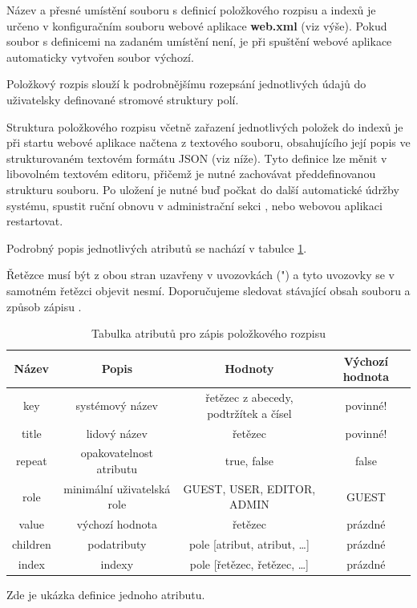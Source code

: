 {\color{OliveGreen} Název a přesné umístění souboru s definicí položkového rozpisu a indexů je určeno v konfiguračním souboru webové aplikace {\bf web.xml} (viz výše). Pokud soubor s definicemi na zadaném umístění není, je při spuštění webové aplikace automaticky vytvořen soubor výchozí.}

Položkový rozpis slouží k podrobnějšímu rozepsání jednotlivých údajů do uživatelsky definované stromové struktury polí.

Struktura položkového rozpisu včetně zařazení jednotlivých položek do indexů je při startu webové aplikace načtena z textového souboru, obsahujícího její popis ve strukturovaném textovém formátu JSON (viz níže). Tyto definice lze měnit v libovolném textovém editoru, přičemž je nutné zachovávat předdefinovanou strukturu souboru. Po uložení je nutné buď počkat do další automatické údržby systému, spustit ruční obnovu v administrační sekci , nebo webovou aplikaci restartovat.

Podrobný popis jednotlivých atributů se nachází v tabulce \ref{tab:rozpis}.

Řetězce musí být z obou stran uzavřeny v uvozovkách (") a tyto uvozovky se v samotném řetězci objevit nesmí. Doporučujeme sledovat stávající obsah souboru a způsob zápisu .

\begin{table}
\centering
\begin{tabular}{|c|c|c|c|}
\hline
Název & Popis & Hodnoty & Výchozí hodnota \\
\hline
\hline
key & systémový název & řetězec z abecedy, podtržítek a čísel & povinné! \\
\hline
title & lidový název & řetězec & povinné! \\
\hline
repeat & opakovatelnost atributu & true, false & false \\
\hline
role & minimální uživatelská role & GUEST, USER, EDITOR, ADMIN & GUEST \\
\hline
value & výchozí hodnota & řetězec & prázdné \\
\hline
children & podatributy & pole [atribut, atribut, \ldots] & prázdné \\
\hline
index & indexy & pole [řetězec, řetězec, \ldots] & prázdné \\
\hline
\end{tabular}
\caption{Tabulka atributů pro zápis položkového rozpisu}
\label{tab:rozpis}
\end{table}

Zde je ukázka definice jednoho atributu. 

